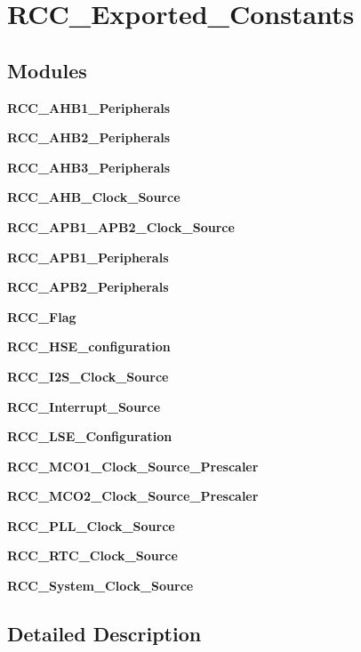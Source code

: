 \section{R\+C\+C\+\_\+\+Exported\+\_\+\+Constants}
\label{group__RCC__Exported__Constants}
\subsection*{Modules}
\begin{DoxyCompactItemize}
\item 
\textbf{ R\+C\+C\+\_\+\+A\+H\+B1\+\_\+\+Peripherals}
\item 
\textbf{ R\+C\+C\+\_\+\+A\+H\+B2\+\_\+\+Peripherals}
\item 
\textbf{ R\+C\+C\+\_\+\+A\+H\+B3\+\_\+\+Peripherals}
\item 
\textbf{ R\+C\+C\+\_\+\+A\+H\+B\+\_\+\+Clock\+\_\+\+Source}
\item 
\textbf{ R\+C\+C\+\_\+\+A\+P\+B1\+\_\+\+A\+P\+B2\+\_\+\+Clock\+\_\+\+Source}
\item 
\textbf{ R\+C\+C\+\_\+\+A\+P\+B1\+\_\+\+Peripherals}
\item 
\textbf{ R\+C\+C\+\_\+\+A\+P\+B2\+\_\+\+Peripherals}
\item 
\textbf{ R\+C\+C\+\_\+\+Flag}
\item 
\textbf{ R\+C\+C\+\_\+\+H\+S\+E\+\_\+configuration}
\item 
\textbf{ R\+C\+C\+\_\+\+I2\+S\+\_\+\+Clock\+\_\+\+Source}
\item 
\textbf{ R\+C\+C\+\_\+\+Interrupt\+\_\+\+Source}
\item 
\textbf{ R\+C\+C\+\_\+\+L\+S\+E\+\_\+\+Configuration}
\item 
\textbf{ R\+C\+C\+\_\+\+M\+C\+O1\+\_\+\+Clock\+\_\+\+Source\+\_\+\+Prescaler}
\item 
\textbf{ R\+C\+C\+\_\+\+M\+C\+O2\+\_\+\+Clock\+\_\+\+Source\+\_\+\+Prescaler}
\item 
\textbf{ R\+C\+C\+\_\+\+P\+L\+L\+\_\+\+Clock\+\_\+\+Source}
\item 
\textbf{ R\+C\+C\+\_\+\+R\+T\+C\+\_\+\+Clock\+\_\+\+Source}
\item 
\textbf{ R\+C\+C\+\_\+\+System\+\_\+\+Clock\+\_\+\+Source}
\end{DoxyCompactItemize}


\subsection{Detailed Description}
